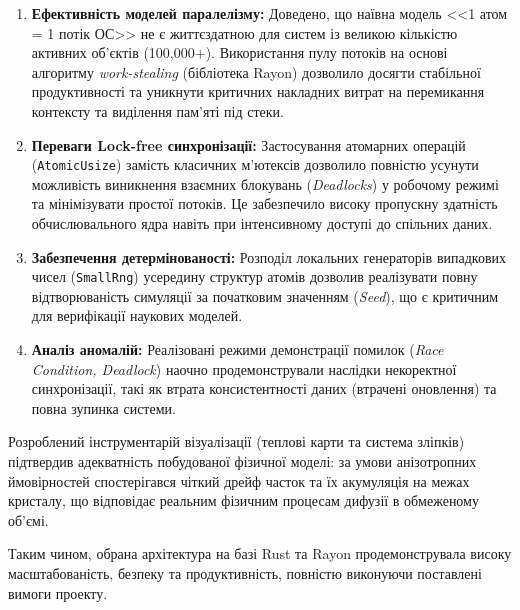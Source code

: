 \documentclass[14pt, a4paper]{extreport}
\begin{document}
	\begin{enumerate}
		\item \textbf{Ефективність моделей паралелізму:} Доведено, що наївна модель <<1 атом = 1 потік ОС>> не є життєздатною для систем із великою кількістю активних об'єктів (100,000+). Використання пулу потоків на основі алгоритму \textit{work-stealing} (бібліотека Rayon) дозволило досягти стабільної продуктивності та уникнути критичних накладних витрат на перемикання контексту та виділення пам'яті під стеки.
		
		\item \textbf{Переваги Lock-free синхронізації:} Застосування атомарних операцій (\texttt{AtomicUsize}) замість класичних м'ютексів дозволило повністю усунути можливість виникнення взаємних блокувань (\textit{Deadlocks}) у робочому режимі та мінімізувати простої потоків. Це забезпечило високу пропускну здатність обчислювального ядра навіть при інтенсивному доступі до спільних даних.
		
		\item \textbf{Забезпечення детермінованості:} Розподіл локальних генераторів випадкових чисел (\texttt{SmallRng}) усередину структур атомів дозволив реалізувати повну відтворюваність симуляції за початковим значенням (\textit{Seed}), що є критичним для верифікації наукових моделей.
		
		\item \textbf{Аналіз аномалій:} Реалізовані режими демонстрації помилок (\textit{Race Condition, Deadlock}) наочно продемонстрували наслідки некоректної синхронізації, такі як втрата консистентності даних (втрачені оновлення) та повна зупинка системи.
	\end{enumerate}
	
	Розроблений інструментарій візуалізації (теплові карти та система зліпків) підтвердив адекватність побудованої фізичної моделі: за умови анізотропних ймовірностей спостерігався чіткий дрейф часток та їх акумуляція на межах кристалу, що відповідає реальним фізичним процесам дифузії в обмеженому об'ємі. 
	
	Таким чином, обрана архітектура на базі Rust та Rayon продемонструвала високу масштабованість, безпеку та продуктивність, повністю виконуючи поставлені вимоги проекту.
\end{document}

